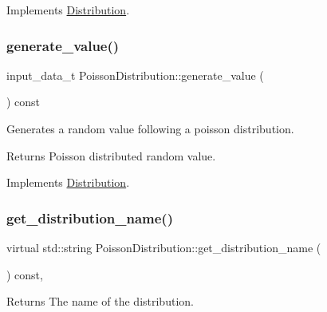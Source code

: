 Implements \hyperlink{classDistribution_a5146d1193531b15a872d401cb97f06ca}{Distribution}.

\mbox{\label{classPoissonDistribution_a8d8c1d669615f2259af239df01550f7d}} 
\subsubsection{\texorpdfstring{generate\+\_\+value()}{generate\_value()}}
{\footnotesize\ttfamily input\+\_\+data\+\_\+t Poisson\+Distribution\+::generate\+\_\+value (\begin{DoxyParamCaption}{ }\end{DoxyParamCaption}) const\hspace{0.3cm}{\ttfamily [virtual]}}

Generates a random value following a poisson distribution. \begin{DoxyReturn}{Returns}
Poisson distributed random value. 
\end{DoxyReturn}


Implements \hyperlink{classDistribution_a096af8a5e59bd38e0ad7da10632e0c83}{Distribution}.

\mbox{\label{classPoissonDistribution_a2c6ac9d330241badbdeadc065ad47c1e}} 
\subsubsection{\texorpdfstring{get\+\_\+distribution\+\_\+name()}{get\_distribution\_name()}}
{\footnotesize\ttfamily virtual std\+::string Poisson\+Distribution\+::get\+\_\+distribution\+\_\+name (\begin{DoxyParamCaption}{ }\end{DoxyParamCaption}) const\hspace{0.3cm}{\ttfamily [inline]}, {\ttfamily [virtual]}}

\begin{DoxyReturn}{Returns}
The name of the distribution. 
\end{DoxyReturn}


